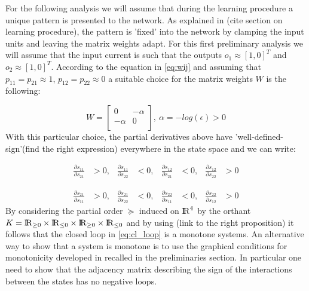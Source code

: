 For the following analysis we will assume that during the learning procedure a unique pattern is presented to the network. As explained in (cite section on learning procedure), the pattern is 'fixed' into the network by clamping the input units and leaving the matrix weights adapt. For this first preliminary analysis we will assume that the input current is such that the outputs $o_1 \approx [1 , 0]^T$ and $o_2 \approx [1, 0]^T$. According to the equation in \eqref{eq:wij} and assuming that $p_{11} = p_{21} \approx 1$, $p_{12} = p_{22} \approx 0$ a suitable choice for the matrix weights $W$ is the following:  

\begin{equation}
W = \begin{bmatrix}
 0 & -\alpha \\
 -\alpha & 0 \\
\end{bmatrix},\  \alpha = - log(\epsilon) >0
\label{eq:coup_eps_matrix}
\end{equation}
With this particular choice, the partial derivatives above have 'well-defined-sign'(find the right expression) everywhere in the state space and we can write:

\begin{equation}
\begin{aligned}
\frac{\partial s_{11}}{\partial s_{21}} & > 0, & 
\frac{\partial s_{11}}{\partial s_{22}} & < 0, & \frac{\partial s_{12}}{\partial s_{21}} &< 0, & \frac{\partial s_{12}}{\partial s_{22}}  &> 0
\end{aligned}
\end{equation}

\begin{equation}
\begin{aligned}
\frac{\partial s_{21}}{\partial s_{11}} & > 0, & 
\frac{\partial s_{21}}{\partial s_{22}} & < 0, & \frac{\partial s_{22}}{\partial s_{11}} &< 0, & \frac{\partial s_{22}}{\partial s_{12}}  &> 0
\end{aligned}
\end{equation}
By considering the partial order $\succeq$ induced on ${\rm I\!R}^4$ by the orthant $K = {\rm I\!R}_{\geq 0} \times {\rm I\!R}_{\leq 0} \times {\rm I\!R}_{\geq 0} \times {\rm I\!R}_{\leq 0}$ and by using (link to the right proposition) it follows that the closed loop in \eqref{eq:cl_loop} is a monotone systems. An alternative way to show that a system is monotone is to use the graphical conditions for monotonicity developed in \cite{angeli2004multigraph} recalled in the preliminaries section. In particular one need to show that the adjacency matrix describing the sign of the interactions between the states has no negative loops.

